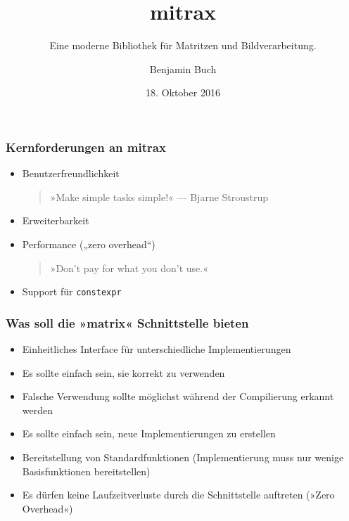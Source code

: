 \documentclass{beamer}
\title{mitrax}
\author{Benjamin Buch}
\date{18. Oktober 2016}
\subtitle{Eine moderne Bibliothek für Matritzen und Bildverarbeitung.}
\begin{document}
    \maketitle
\begin{frame}
    \frametitle{Kernforderungen an mitrax}
    \begin{itemize}
        \item Benutzerfreundlichkeit\\
        \begin{quote}»Make simple tasks simple!« \hspace{1em} — Bjarne Stroustrup\end{quote}
        \item Erweiterbarkeit\\
        \hspace{1em}
        \item Performance („zero overhead“)\\
        \begin{quote}»Don’t pay for what you don’t use.«\end{quote}
        \item Support für \texttt{constexpr}\\
        \hspace{1em}
    \end{itemize}
\end{frame}
\begin{frame}
    \frametitle{Was soll die »matrix« Schnittstelle bieten}
    \begin{itemize}
        \item Einheitliches Interface für unterschiedliche Implementierungen
        \item Es sollte einfach sein, sie korrekt zu verwenden
        \item Falsche Verwendung sollte möglichst während der Compilierung erkannt werden
        \item Es sollte einfach sein, neue Implementierungen zu erstellen
        \item Bereitstellung von Standardfunktionen (Implementierung muss nur wenige Basisfunktionen bereitstellen)
        \item Es dürfen keine Laufzeitverluste durch die Schnittstelle auftreten (»Zero Overhead«)
    \end{itemize}
\end{frame}
\end{document}
